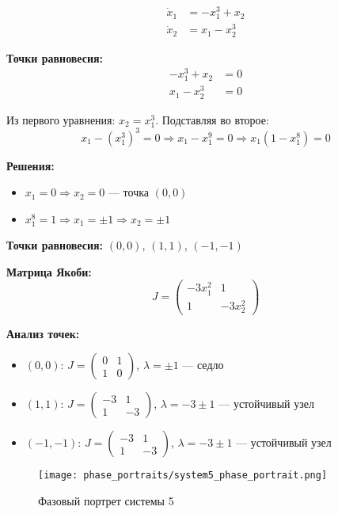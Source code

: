 \begin{align}
\dot{x}_1 &= -x_1^3 + x_2 \\
\dot{x}_2 &= x_1 - x_2^3
\end{align}

\textbf{Точки равновесия:}
\begin{align}
-x_1^3 + x_2 &= 0 \\
x_1 - x_2^3 &= 0
\end{align}

Из первого уравнения: $x_2 = x_1^3$. Подставляя во второе:
$$x_1 - (x_1^3)^3 = 0 \Rightarrow x_1 - x_1^9 = 0 \Rightarrow x_1(1 - x_1^8) = 0$$

\textbf{Решения:}
\begin{itemize}
\item $x_1 = 0 \Rightarrow x_2 = 0$ --- точка $(0, 0)$
\item $x_1^8 = 1 \Rightarrow x_1 = \pm 1 \Rightarrow x_2 = \pm 1$
\end{itemize}

\textbf{Точки равновесия:} $(0, 0)$, $(1, 1)$, $(-1, -1)$

\textbf{Матрица Якоби:}
$$J = \begin{pmatrix} -3x_1^2 & 1 \\ 1 & -3x_2^2 \end{pmatrix}$$

\textbf{Анализ точек:}
\begin{itemize}
\item $(0, 0)$: $J = \begin{pmatrix} 0 & 1 \\ 1 & 0 \end{pmatrix}$, $\lambda = \pm 1$ --- седло
\item $(1, 1)$: $J = \begin{pmatrix} -3 & 1 \\ 1 & -3 \end{pmatrix}$, $\lambda = -3 \pm 1$ --- устойчивый узел
\item $(-1, -1)$: $J = \begin{pmatrix} -3 & 1 \\ 1 & -3 \end{pmatrix}$, $\lambda = -3 \pm 1$ --- устойчивый узел
\end{itemize}

\begin{figure}[H]
\centering
\texttt{[image: phase\_portraits/system5\_phase\_portrait.png]}
\caption{Фазовый портрет системы 5}
\label{fig:system5_phase_portrait}
\end{figure}

